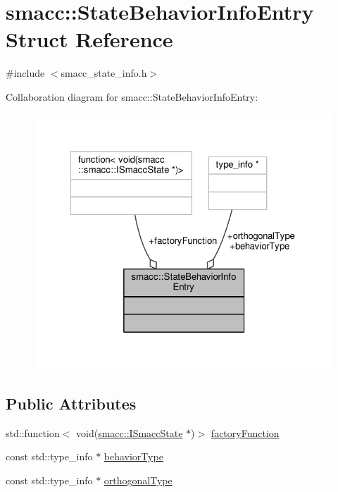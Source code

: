 \hypertarget{structsmacc_1_1StateBehaviorInfoEntry}{}\section{smacc\+:\+:State\+Behavior\+Info\+Entry Struct Reference}
\label{structsmacc_1_1StateBehaviorInfoEntry}


{\ttfamily \#include $<$smacc\+\_\+state\+\_\+info.\+h$>$}



Collaboration diagram for smacc\+:\+:State\+Behavior\+Info\+Entry\+:
\nopagebreak
\begin{figure}[H]
\begin{center}
\leavevmode
\includegraphics[width=323pt]{structsmacc_1_1StateBehaviorInfoEntry__coll__graph}
\end{center}
\end{figure}
\subsection*{Public Attributes}
\begin{DoxyCompactItemize}
\item 
std\+::function$<$ void(\hyperlink{classsmacc_1_1ISmaccState}{smacc\+::\+I\+Smacc\+State} $\ast$)$>$ \hyperlink{structsmacc_1_1StateBehaviorInfoEntry_a0af2d6aabb921c95fd723b554cc21aa9}{factory\+Function}
\item 
const std\+::type\+\_\+info $\ast$ \hyperlink{structsmacc_1_1StateBehaviorInfoEntry_a9f77a396b80171e010b3c30778b2f3f0}{behavior\+Type}
\item 
const std\+::type\+\_\+info $\ast$ \hyperlink{structsmacc_1_1StateBehaviorInfoEntry_aefc43616f2bd059594b3b90d6ad47916}{orthogonal\+Type}
\end{DoxyCompactItemize}


